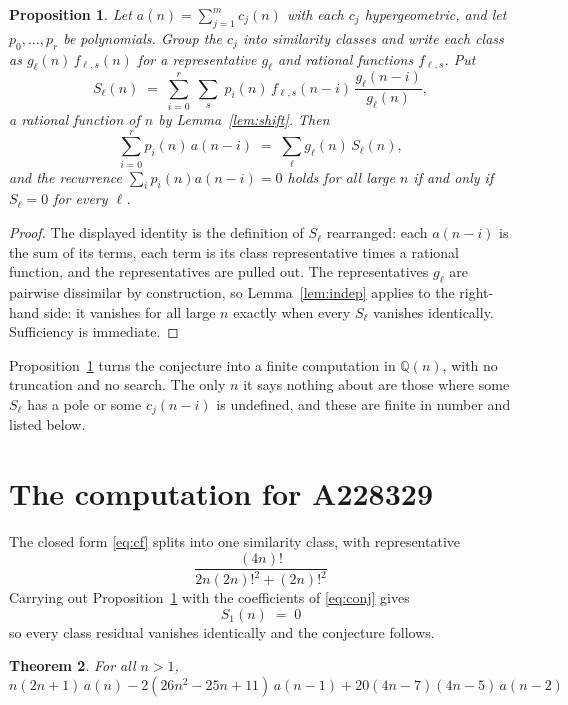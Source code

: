 \documentclass[11pt,a4paper]{article}
\theoremstyle{plain}
\newtheorem{theorem}{Theorem}
\newtheorem{proposition}[theorem]{Proposition}
\theoremstyle{definition}
\begin{document}
\begin{proposition}\label{prop:main}
Let $a(n)=\sum_{j=1}^{m}c_{j}(n)$ with each $c_{j}$ hypergeometric, and let
$p_{0},\dots,p_{r}$ be polynomials. Group the $c_{j}$ into similarity classes and write
each class as $g_{\ell}(n)\,f_{\ell,s}(n)$ for a representative $g_{\ell}$ and rational
functions $f_{\ell,s}$. Put
\[
S_{\ell}(n)\;=\;\sum_{i=0}^{r}\;\sum_{s}\;p_{i}(n)\,f_{\ell,s}(n-i)\,
\frac{g_{\ell}(n-i)}{g_{\ell}(n)} ,
\]
a rational function of $n$ by Lemma~\ref{lem:shift}. Then
\[
\sum_{i=0}^{r}p_{i}(n)\,a(n-i)\;=\;\sum_{\ell}g_{\ell}(n)\,S_{\ell}(n),
\]
and the recurrence $\sum_{i}p_{i}(n)a(n-i)=0$ holds for all large $n$ if and only if
$S_{\ell}=0$ for every $\ell$.
\end{proposition}

\begin{proof}
The displayed identity is the definition of $S_{\ell}$ rearranged: each $a(n-i)$ is the
sum of its terms, each term is its class representative times a rational function, and the
representatives are pulled out. The representatives $g_{\ell}$ are pairwise dissimilar by
construction, so Lemma~\ref{lem:indep} applies to the right-hand side: it vanishes for all
large $n$ exactly when every $S_{\ell}$ vanishes identically. Sufficiency is immediate.
\end{proof}

Proposition~\ref{prop:main} turns the conjecture into a finite computation in
$\mathbb{Q}(n)$, with no truncation and no search. The only $n$ it says nothing about are
those where some $S_{\ell}$ has a pole or some $c_{j}(n-i)$ is undefined, and these are
finite in number and listed below.

\section{The computation for A228329}

The closed form \eqref{eq:cf} splits into one similarity class, with
representative
\[
\frac{\left(4 n\right)!}{2 n \left(2 n\right)!^{2} + \left(2 n\right)!^{2}}
\]
Carrying out Proposition~\ref{prop:main} with the coefficients of \eqref{eq:conj} gives
\[
S_{1}(n)\;=\;0
\]
so every class residual vanishes identically and the conjecture follows.

\begin{theorem}
For all $n> 1$,
\[
n \left(2 n + 1\right)\,a(n) -  2 \left(26 n^{2} - 25 n + 11\right)\,a(n-1) + 20 \left(4 n - 7\right) \left(4 n - 5\right)\,a(n-2)
\]
\end{theorem}
\end{document}
